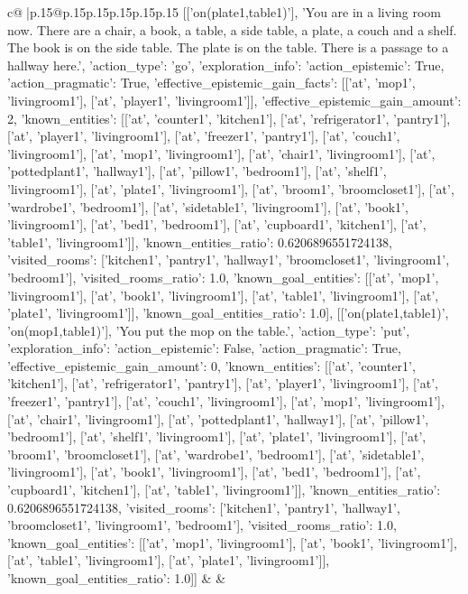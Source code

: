 \documentclass{article}
\begin{document}
{\begin{supertabular}{c@{$\;$}|p{.15\linewidth}@{}p{.15\linewidth}p{.15\linewidth}p{.15\linewidth}p{.15\linewidth}p{.15\linewidth}}
{{{[['on(plate1,table1)'], 'You are in a living room now. There are a chair, a book, a table, a side table, a plate, a couch and a shelf. The book is on the side table. The plate is on the table. There is a passage to a hallway here.', {'action_type': 'go', 'exploration_info': {'action_epistemic': True, 'action_pragmatic': True, 'effective_epistemic_gain_facts': [['at', 'mop1', 'livingroom1'], ['at', 'player1', 'livingroom1']], 'effective_epistemic_gain_amount': 2, 'known_entities': [['at', 'counter1', 'kitchen1'], ['at', 'refrigerator1', 'pantry1'], ['at', 'player1', 'livingroom1'], ['at', 'freezer1', 'pantry1'], ['at', 'couch1', 'livingroom1'], ['at', 'mop1', 'livingroom1'], ['at', 'chair1', 'livingroom1'], ['at', 'pottedplant1', 'hallway1'], ['at', 'pillow1', 'bedroom1'], ['at', 'shelf1', 'livingroom1'], ['at', 'plate1', 'livingroom1'], ['at', 'broom1', 'broomcloset1'], ['at', 'wardrobe1', 'bedroom1'], ['at', 'sidetable1', 'livingroom1'], ['at', 'book1', 'livingroom1'], ['at', 'bed1', 'bedroom1'], ['at', 'cupboard1', 'kitchen1'], ['at', 'table1', 'livingroom1']], 'known_entities_ratio': 0.6206896551724138, 'visited_rooms': ['kitchen1', 'pantry1', 'hallway1', 'broomcloset1', 'livingroom1', 'bedroom1'], 'visited_rooms_ratio': 1.0, 'known_goal_entities': [['at', 'mop1', 'livingroom1'], ['at', 'book1', 'livingroom1'], ['at', 'table1', 'livingroom1'], ['at', 'plate1', 'livingroom1']], 'known_goal_entities_ratio': 1.0}}], [['on(plate1,table1)', 'on(mop1,table1)'], 'You put the mop on the table.', {'action_type': 'put', 'exploration_info': {'action_epistemic': False, 'action_pragmatic': True, 'effective_epistemic_gain_amount': 0, 'known_entities': [['at', 'counter1', 'kitchen1'], ['at', 'refrigerator1', 'pantry1'], ['at', 'player1', 'livingroom1'], ['at', 'freezer1', 'pantry1'], ['at', 'couch1', 'livingroom1'], ['at', 'mop1', 'livingroom1'], ['at', 'chair1', 'livingroom1'], ['at', 'pottedplant1', 'hallway1'], ['at', 'pillow1', 'bedroom1'], ['at', 'shelf1', 'livingroom1'], ['at', 'plate1', 'livingroom1'], ['at', 'broom1', 'broomcloset1'], ['at', 'wardrobe1', 'bedroom1'], ['at', 'sidetable1', 'livingroom1'], ['at', 'book1', 'livingroom1'], ['at', 'bed1', 'bedroom1'], ['at', 'cupboard1', 'kitchen1'], ['at', 'table1', 'livingroom1']], 'known_entities_ratio': 0.6206896551724138, 'visited_rooms': ['kitchen1', 'pantry1', 'hallway1', 'broomcloset1', 'livingroom1', 'bedroom1'], 'visited_rooms_ratio': 1.0, 'known_goal_entities': [['at', 'mop1', 'livingroom1'], ['at', 'book1', 'livingroom1'], ['at', 'table1', 'livingroom1'], ['at', 'plate1', 'livingroom1']], 'known_goal_entities_ratio': 1.0}}]] 
	  } 
	   } 
	   } 
	 & & \\ 
 


\end{supertabular}}
\end{document}
